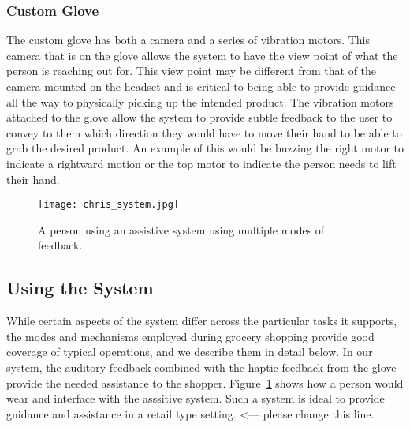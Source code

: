\subsubsection{Custom Glove}
The custom glove has both a camera and a series of vibration motors.
This camera that is on the glove allows the system to have the view
 point of what the person is reaching out for. This view point may be different from
that of the camera mounted on the headset and is critical to being able to provide
guidance all the way to physically picking up the intended product.
The vibration motors attached to the glove allow the system to provide
subtle feedback to the user to convey to them which direction they would
have to move their hand to be able to grab the desired product. An
example of this would be buzzing the right motor to indicate a
rightward motion or the top motor to indicate the person needs to lift
their hand.

\begin{figure}[!htb]
\centering
\vspace{-5pt}
\texttt{[image: chris\_system.jpg]}
\caption{ A person using an assistive system using multiple modes of feedback.}
\label{fig:whole_system_chris}
\end{figure}

\subsection{Using the System}
While certain aspects of the system differ across the particular tasks it supports, 
the modes and mechanisms employed during grocery shopping provide good coverage of typical operations, and we describe them in detail below.
In our system, the auditory feedback combined with the haptic feedback from the glove provide the needed assistance to the shopper. 
Figure~\ref{fig:whole_system_chris} shows how a person would wear and interface with the asssitive system. 
Such a system is ideal to provide guidance and assistance in a retail type setting. <--- please change this line.
 
